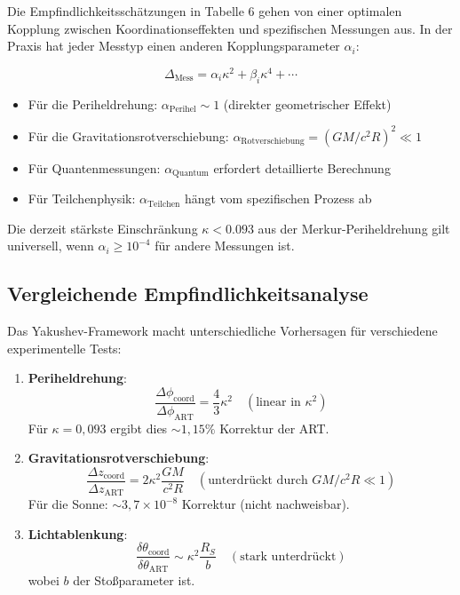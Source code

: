 \documentclass[11pt,a4paper]{article}
\begin{document}
	Die Empfindlichkeitsschätzungen in Tabelle 6 gehen von einer optimalen Kopplung zwischen Koordinationseffekten und spezifischen Messungen aus. In der Praxis hat jeder Messtyp einen anderen Kopplungsparameter $\alpha_i$:
	
	\begin{equation}
		\Delta_{\text{Mess}} = \alpha_i \kappa^2 + \beta_i \kappa^4 + \cdots
	\end{equation}
	
	\begin{itemize}
		\item Für die Periheldrehung: $\alpha_{\text{Perihel}} \sim 1$ (direkter geometrischer Effekt)
		\item Für die Gravitationsrotverschiebung: $\alpha_{\text{Rotverschiebung}} = (GM/c^2R)^2 \ll 1$
		\item Für Quantenmessungen: $\alpha_{\text{Quantum}}$ erfordert detaillierte Berechnung
		\item Für Teilchenphysik: $\alpha_{\text{Teilchen}}$ hängt vom spezifischen Prozess ab
	\end{itemize}
	
	Die derzeit stärkste Einschränkung $\kappa < 0.093$ aus der Merkur-Periheldrehung gilt universell, wenn $\alpha_i \geq 10^{-4}$ für andere Messungen ist.
	
	\subsection{Vergleichende Empfindlichkeitsanalyse}
	\label{subsec:comparative-sensitivity}
	
	Das Yakushev-Framework macht unterschiedliche Vorhersagen für verschiedene experimentelle Tests:
	
	\begin{enumerate}
		\item \textbf{Periheldrehung}: 
		\[
		\frac{\Delta\phi_{\text{coord}}}{\Delta\phi_{\text{ART}}} = \frac{4}{3}\kappa^2 \quad (\text{linear in }\kappa^2)
		\]
		Für $\kappa = 0,093$ ergibt dies $\sim 1,15\%$ Korrektur der ART.
		
		\item \textbf{Gravitationsrotverschiebung}:
		\[
		\frac{\Delta z_{\text{coord}}}{\Delta z_{\text{ART}}} = 2\kappa^2 \frac{GM}{c^2R} \quad (\text{unterdrückt durch }GM/c^2R \ll 1)
		\]
		Für die Sonne: $\sim 3,7\times10^{-8}$ Korrektur (nicht nachweisbar).
		
		\item \textbf{Lichtablenkung}:
		\[
		\frac{\delta\theta_{\text{coord}}}{\delta\theta_{\text{ART}}} \sim \kappa^2 \frac{R_S}{b} \quad (\text{stark unterdrückt})
		\]
		wobei $b$ der Stoßparameter ist.
	\end{enumerate}
	
\end{document}
